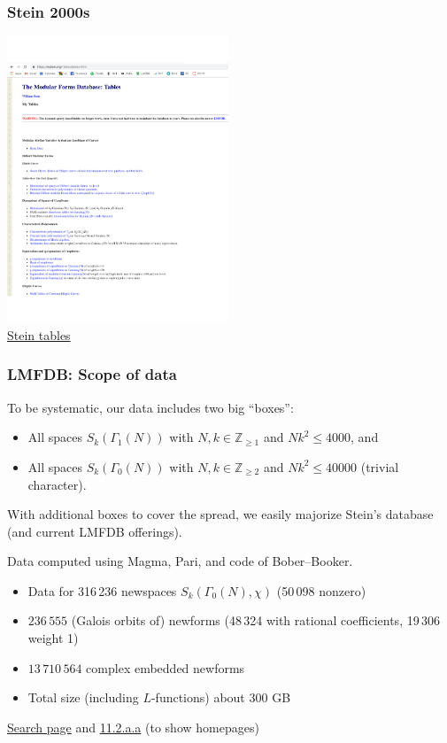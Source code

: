 \documentclass[xcolor=dvipsnames]{beamer}
\theoremstyle{plain}
\newcommand{\Z}{\mathbb Z}
\begin{document}
\begin{frame}[plain]
\frametitle{Stein 2000s} \pause

\begin{center}
\includegraphics[width=2.6in]{stein.pdf} \\
\href{https://wstein.org/Tables/tables.html}{Stein tables}
\end{center}

\end{frame}

\begin{frame}[plain]
\frametitle{LMFDB: Scope of data} \pause

To be systematic, our data includes two big ``boxes'':  \pause
\begin{itemize}
\item All spaces $S_k(\Gamma_1(N))$ with $N,k \in \Z_{\geq 1}$ and $Nk^2 \leq 4000$, \pause and
\item All spaces $S_k(\Gamma_0(N))$ with $N,k \in \Z_{\geq 2}$ and $Nk^2 \leq 40000$ (trivial character). \pause
\end{itemize}

With additional boxes to cover the spread, we easily majorize Stein's database (and current LMFDB offerings).  \pause

Data computed using Magma, Pari, and code of Bober--Booker. \pause

\begin{itemize}
\item Data for 316\,236 newspaces $S_k(\Gamma_0(N),\chi)$ (50\,098 nonzero) \pause
\item $236\,555$ (Galois orbits of) newforms (48\,324 with rational coefficients, 19\,306 weight 1) \pause
\item $13\,710\,564$ complex embedded newforms \pause
\item Total size (including $L$-functions) about 300 GB \pause
\end{itemize}

\href{http://cmfs.lmfdb.xyz/ModularForm/GL2/Q/holomorphic/}{Search page} and 
\href{http://cmfs.lmfdb.xyz/ModularForm/GL2/Q/holomorphic/11/2/a/a/}{11.2.a.a} (to show homepages)
\end{frame}
\end{document}
